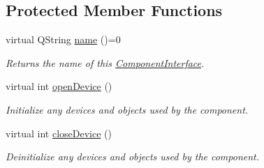 \subsection*{Protected Member Functions}
\begin{DoxyCompactItemize}
\item 
\hypertarget{class_component_interface_a8eacf83b45782b8393551de38d26de8f}{virtual Q\-String \hyperlink{class_component_interface_a8eacf83b45782b8393551de38d26de8f}{name} ()=0}\label{class_component_interface_a8eacf83b45782b8393551de38d26de8f}

\begin{DoxyCompactList}\small\item\em Returns the name of this \hyperlink{class_component_interface}{Component\-Interface}. \end{DoxyCompactList}\item 
\hypertarget{class_component_interface_a93b77c54abbcd8ea42afb9fd204049bd}{virtual int \hyperlink{class_component_interface_a93b77c54abbcd8ea42afb9fd204049bd}{open\-Device} ()}\label{class_component_interface_a93b77c54abbcd8ea42afb9fd204049bd}

\begin{DoxyCompactList}\small\item\em Initialize any devices and objects used by the component. \end{DoxyCompactList}\item 
\hypertarget{class_component_interface_ab4433362fe7d1e5c09dc556e7105f775}{virtual int \hyperlink{class_component_interface_ab4433362fe7d1e5c09dc556e7105f775}{close\-Device} ()}\label{class_component_interface_ab4433362fe7d1e5c09dc556e7105f775}

\begin{DoxyCompactList}\small\item\em Deinitialize any devices and objects used by the component. \end{DoxyCompactList}\end{DoxyCompactItemize}
